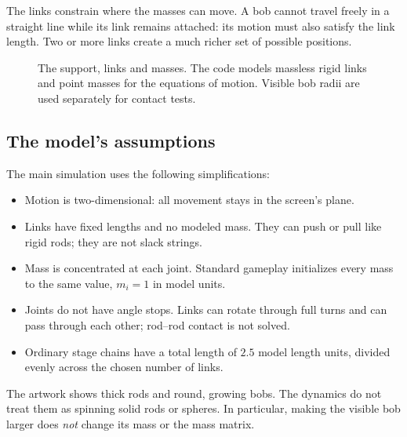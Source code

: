 \documentclass[11pt,a4paper]{article}
\begin{document}
The links constrain where the masses can move. A bob cannot travel freely in a straight line while its link remains attached: its motion must also satisfy the link length. Two or more links create a much richer set of possible positions.
\begin{figure}[H]\centering
{}
\caption{The support, links and masses. The code models massless rigid links and point masses for the equations of motion. Visible bob radii are used separately for contact tests.}
\end{figure}
\subsection{The model's assumptions}
The main simulation uses the following simplifications:
\begin{itemize}
\item Motion is two-dimensional: all movement stays in the screen's plane.
\item Links have fixed lengths and no modeled mass. They can push or pull like rigid rods; they are not slack strings.
\item Mass is concentrated at each joint. Standard gameplay initializes every mass to the same value, \(m_i=1\) in model units.
\item Joints do not have angle stops. Links can rotate through full turns and can pass through each other; rod--rod contact is not solved.
\item Ordinary stage chains have a total length of \(2.5\) model length units, divided evenly across the chosen number of links.
\end{itemize}
\begin{arcade}The artwork shows thick rods and round, growing bobs. The dynamics do not treat them as spinning solid rods or spheres. In particular, making the visible bob larger does \emph{not} change its mass or the mass matrix.\end{arcade}
\end{document}
